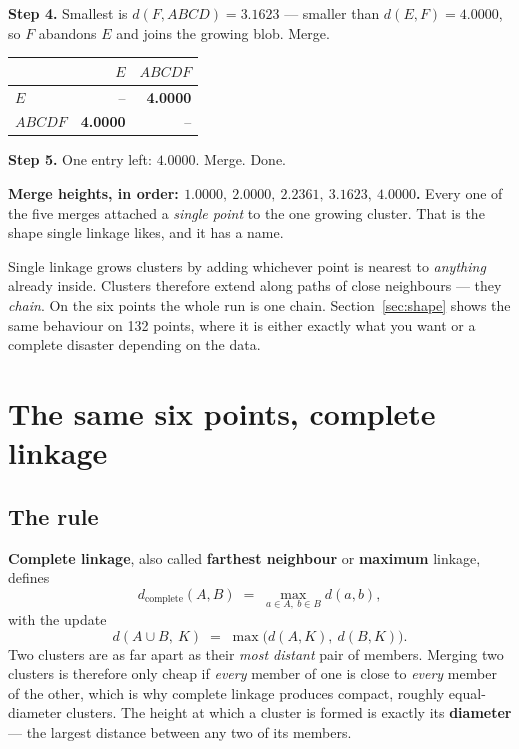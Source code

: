 \documentclass[11pt]{article}
\begin{document}
\begin{worked}
\textbf{Step 4.} Smallest is $d(F, ABCD) = 3.1623$ --- smaller than
$d(E,F) = 4.0000$, so $F$ abandons $E$ and joins the growing blob. Merge.
\begin{center}\small
\begin{tabular}{lrr}
  \toprule
  & $E$ & $ABCDF$ \\
  \midrule
  $E$     & --     & \textbf{4.0000} \\
  $ABCDF$ & \textbf{4.0000} & -- \\
  \bottomrule
\end{tabular}
\end{center}

\textbf{Step 5.} One entry left: $4.0000$. Merge. Done.

\medskip
\textbf{Merge heights, in order: $1.0000,\ 2.0000,\ 2.2361,\ 3.1623,\
4.0000$.} Every one of the five merges attached a \emph{single point} to the
one growing cluster. That is the shape single linkage likes, and it has a
name.
\end{worked}

\begin{keyidea}[Chaining]
Single linkage grows clusters by adding whichever point is nearest to
\emph{anything} already inside. Clusters therefore extend along paths of close
neighbours --- they \emph{chain}. On the six points the whole run is one chain.
Section~\ref{sec:shape} shows the same behaviour on 132 points, where it is
either exactly what you want or a complete disaster depending on the data.
\end{keyidea}

\section{The same six points, complete linkage}
\label{sec:complete}

\subsection{The rule}

\textbf{Complete linkage}, also called \textbf{farthest neighbour} or
\textbf{maximum} linkage, defines
\begin{equation}
  d_{\text{complete}}(A, B) \;=\; \max_{a \in A,\ b \in B} d(a, b),
  \label{eq:complete}
\end{equation}
with the update
\begin{equation}
  d(A \cup B,\ K) \;=\; \max\bigl(d(A,K),\ d(B,K)\bigr).
  \label{eq:completeupd}
\end{equation}
Two clusters are as far apart as their \emph{most distant} pair of members.
Merging two clusters is therefore only cheap if \emph{every} member of one is
close to \emph{every} member of the other, which is why complete linkage
produces compact, roughly equal-diameter clusters. The height at which a
cluster is formed is exactly its \textbf{diameter} --- the largest distance
between any two of its members.
\end{document}
